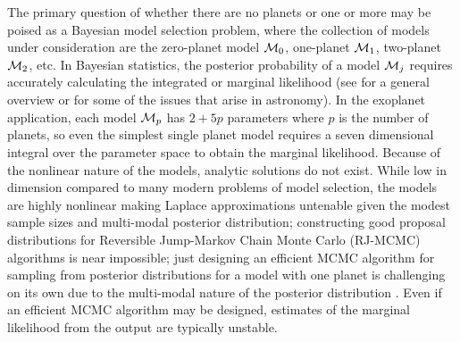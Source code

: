 The primary question of whether there are no planets or one or more
may be poised as a Bayesian model selection problem, where the
collection of models under consideration are the zero-planet model
${\cal{M}}_0$, one-planet ${\cal{M}}_1$, two-planet ${\cal{M}}_2$, etc.  In Bayesian
statistics, the posterior probability of a model ${\cal{M}}_j$ requires
accurately calculating the integrated or marginal likelihood (see
\citet{clyd:geor:2004} for a general overview or
\citet{clyd:etal:2007,ford2006bms} for some of the issues that arise in
astronomy).  In the exoplanet application, each model ${\cal{M}}_p$ has
$2+5p$ parameters where $p$ is the number of planets, so even the
simplest single planet model requires a seven dimensional integral
over the parameter space to obtain the marginal likelihood.  Because
of the nonlinear nature of the models, analytic solutions do not
exist.  While low in dimension compared to many modern problems of
model selection, the models are highly nonlinear making Laplace
approximations untenable given the modest sample sizes and multi-modal
posterior distribution; constructing good proposal distributions for
Reversible Jump-Markov Chain Monte Carlo (RJ-MCMC) algorithms is near
impossible; just designing an efficient MCMC algorithm for sampling
from posterior distributions for a model with one planet is
challenging on its own due to the multi-modal nature of the posterior
distribution \citep{ford2006bms}.   Even if an efficient MCMC
algorithm may be designed, estimates of the  marginal likelihood from
the output are typically unstable.


